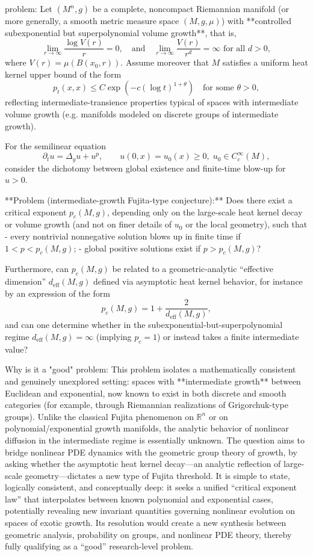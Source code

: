 problem:  
Let \((M^n,g)\) be a complete, noncompact Riemannian manifold (or more generally, a smooth metric measure space \((M,g,\mu)\)) with **controlled subexponential but superpolynomial volume growth**, that is,  
\[
\lim_{r\to\infty} \frac{\log V(r)}{r}=0, 
\quad \text{and} \quad 
\lim_{r\to\infty} \frac{V(r)}{r^d}=\infty \text{ for all } d>0,
\]
where \(V(r)=\mu(B(x_0,r))\).  Assume moreover that \(M\) satisfies a uniform heat kernel upper bound of the form  
\[
p_t(x,x) \le C \exp(-c (\log t)^{1+\theta}) \quad \text{for some } \theta>0,
\]
reflecting intermediate-transience properties typical of spaces with intermediate volume growth (e.g. manifolds modeled on discrete groups of intermediate growth).  

For the semilinear equation  
\[
\partial_t u = \Delta_g u + u^p, \qquad u(0,x)=u_0(x)\ge 0, \; u_0\in C_c^\infty(M),
\]  
consider the dichotomy between global existence and finite-time blow-up for \(u>0\).

**Problem (intermediate-growth Fujita-type conjecture):**  
Does there exist a critical exponent \(p_c(M,g)\), depending only on the large-scale heat kernel decay or volume growth (and not on finer details of \(u_0\) or the local geometry), such that  
- every nontrivial nonnegative solution blows up in finite time if \(1 < p < p_c(M,g)\);  
- global positive solutions exist if \(p>p_c(M,g)\)?  

Furthermore, can \(p_c(M,g)\) be related to a geometric-analytic “effective dimension” \(d_{\mathrm{eff}}(M,g)\) defined via asymptotic heat kernel behavior, for instance by an expression of the form  
\[
p_c(M,g) = 1 + \frac{2}{d_{\mathrm{eff}}(M,g)},
\]
and can one determine whether in the subexponential-but-superpolynomial regime \(d_{\mathrm{eff}}(M,g)=\infty\) (implying \(p_c=1\)) or instead takes a finite intermediate value?

Why is it a "good" problem:  
This problem isolates a mathematically consistent and genuinely unexplored setting: spaces with **intermediate growth** between Euclidean and exponential, now known to exist in both discrete and smooth categories (for example, through Riemannian realizations of Grigorchuk-type groups). Unlike the classical Fujita phenomenon on \(\mathbb{R}^n\) or on polynomial/exponential growth manifolds, the analytic behavior of nonlinear diffusion in the intermediate regime is essentially unknown. The question aims to bridge nonlinear PDE dynamics with the geometric group theory of growth, by asking whether the asymptotic heat kernel decay—an analytic reflection of large-scale geometry—dictates a new type of Fujita threshold. It is simple to state, logically consistent, and conceptually deep: it seeks a unified “critical exponent law” that interpolates between known polynomial and exponential cases, potentially revealing new invariant quantities governing nonlinear evolution on spaces of exotic growth. Its resolution would create a new synthesis between geometric analysis, probability on groups, and nonlinear PDE theory, thereby fully qualifying as a “good” research-level problem.